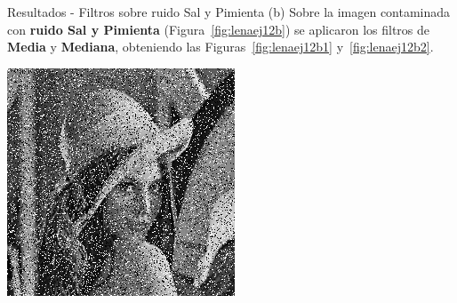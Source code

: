 \documentclass{beamer}
\begin{document}
\begin{frame}[fragile]{Resultados - Filtros sobre ruido Sal y Pimienta (b)}
	\justifying
	Sobre la imagen contaminada con \textcolor{unahurverde}{\textbf{ruido Sal y Pimienta}} (Figura~\ref{fig:lenaej12b})  
	se aplicaron los filtros de \textcolor{unahurverde}{\textbf{Media}} y \textcolor{unahurverde}{\textbf{Mediana}}, obteniendo las Figuras~\ref{fig:lenaej12b1} y~\ref{fig:lenaej12b2}.
	
	\vspace{0.5cm}
	\centering
	\begin{minipage}{0.32\linewidth}
		\centering
		\includegraphics[width=\linewidth]{../results/lena_ej12b}
		\label{fig:lenaej12b}
	\end{minipage}\hfill
	\begin{minipage}{0.32\linewidth}
		\centering

\end{minipage}
\end{frame}
\end{document}
